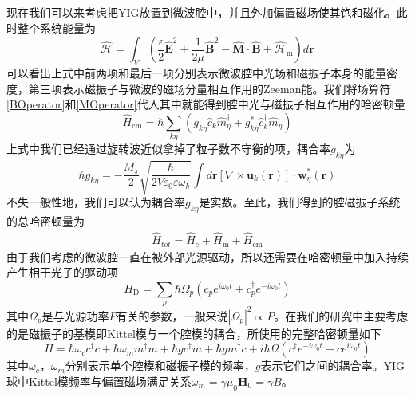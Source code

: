 现在我们可以来考虑把YIG放置到微波腔中，并且外加偏置磁场使其饱和磁化。此时整个系统能量为\cite{reviewCavityMagnonics}
\begin{equation}
\hat{\mathcal{H}}=\int_V \left(\frac{\varepsilon}{2} \hat{\mathbf{E}}^{2}+\frac{1}{2 \mu} \hat{\mathbf{B}}^{2}-\hat{\mathbf{M}} \cdot \hat{\mathbf{B}}+\hat{\mathcal{H}}_{\mathrm{m}}\right) d \mathbf{r}
\end{equation}
可以看出上式中前两项和最后一项分别表示微波腔中光场和磁振子本身的能量密度，第三项表示磁振子与微波的磁场分量相互作用的Zeeman能。我们将场算符\eqref{BOperator}和\eqref{MOperator}代入其中就能得到腔中光与磁振子相互作用的哈密顿量\ChangeNotation\cite{reviewCavityMagnonics}
\begin{equation}
\hat{H}_{\mathrm{cm}}=\hbar \sum_{k \eta}\left(g_{k \eta} \hat{c}_{k} \hat{m}_{\eta}^{\dagger}+g_{k \eta}^{*} \hat{c}_{k}^{\dagger} \hat{m}_{\eta}\right)
\end{equation}
上式中我们已经通过旋转波近似拿掉了粒子数不守衡的项\ChangeNotation，耦合率$g_{k \eta}$为
\begin{equation}
\hbar g_{k \eta}=-\frac{M_{s}}{2} \sqrt{\frac{\hbar}{2 V \varepsilon_{0} \varepsilon \omega_{k}}} \int d \mathbf{r}\left[\nabla \times \mathbf{u}_{k}(\mathbf{r})\right] \cdot \mathbf{w}_{\eta}^{*}(\mathbf{r})
\end{equation}
不失一般性地，我们可以认为耦合率$g_{k \eta}$是实数。至此，我们得到的腔磁振子系统的总哈密顿量为
\begin{equation}
\begin{aligned}
\hat{H}_{tot}=\hat{H}_{\mathrm{c}}+\hat{H}_{\mathrm{m}}+\hat{H}_{\mathrm{cm}}
\end{aligned}
\end{equation}
由于我们考虑的微波腔一直在被外部光源驱动，所以还需要在哈密顿量中加入持续产生相干光子的驱动项
\begin{equation}
\hat{H}_{\mathrm{D}}=\sum_{p} \hbar \Omega_{p}\left({c}_{p} e^{i \omega_{\mathrm{0}} t}+{c}_{p}^{\dagger} e^{-i \omega_{\mathrm{0}} t}\right)
\end{equation}
其中$\Omega_{p}$是与光源功率$P$有关的参数\ChangeNotation，一般来说$|\Omega_{p}|^2 \propto P$。在我们的研究中主要考虑的是磁振子的基模即Kittel模与一个腔模的耦合，所使用的完整哈密顿量如下
\begin{equation}
H = \hbar\omega_{c}c^{\dag}c+\hbar\omega_{m}m^{\dag}m+\hbar gc^{\dag}m+\hbar gm^{\dag}c+i\hbar\Omega(c^{\dag}e^{-i\omega_{0}t}-ce^{i\omega_{0}t})
\label{Hamiltonian}
\end{equation}
其中$\omega_{c}$，$\omega_{m}$分别表示单个腔模和磁振子模的频率，$g$表示它们之间的耦合率。YIG球中Kittel模频率与偏置磁场满足关系$\omega_{m}=\gamma\mu_{0} \mathbf{H}_{0}=\gamma B$。

